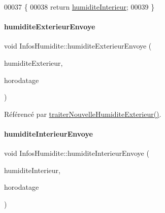 \begin{DoxyCode}
00037 \{
00038     \textcolor{keywordflow}{return} \hyperlink{class_infos_humidite_ad2847e671ad0b90f8dc0940dee107c38}{humiditeInterieur};
00039 \}
\end{DoxyCode}
\mbox{\label{class_infos_humidite_a666d4bd12639460ea0fd2a3f483c2842}} 
\paragraph{\texorpdfstring{humidite\+Exterieur\+Envoye}{humiditeExterieurEnvoye}}
{\footnotesize\ttfamily void Infos\+Humidite\+::humidite\+Exterieur\+Envoye (\begin{DoxyParamCaption}\item[{const double}]{humidite\+Exterieur,  }\item[{Q\+String}]{horodatage }\end{DoxyParamCaption})\hspace{0.3cm}{\ttfamily [signal]}}



Référencé par \hyperlink{class_infos_humidite_a8d17fa3c7d15b1ff8130ae5d22702e5f}{traiter\+Nouvelle\+Humidite\+Exterieur()}.

\mbox{\label{class_infos_humidite_aa0eb7d8a609b837e1b450b7d79e1ff81}} 
\paragraph{\texorpdfstring{humidite\+Interieur\+Envoye}{humiditeInterieurEnvoye}}
{\footnotesize\ttfamily void Infos\+Humidite\+::humidite\+Interieur\+Envoye (\begin{DoxyParamCaption}\item[{const double}]{humidite\+Interieur,  }\item[{Q\+String}]{horodatage }\end{DoxyParamCaption})\hspace{0.3cm}{\ttfamily [signal]}}



